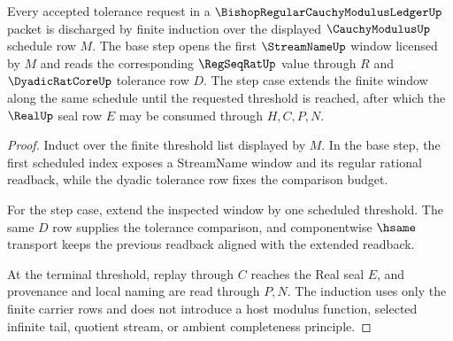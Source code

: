 \begin{theorem}
\label{thm:bishop-regular-cauchy-modulus-ledger-induction}
Every accepted tolerance request in a $\BishopRegularCauchyModulusLedgerUp$ packet is discharged by finite induction over the displayed $\CauchyModulusUp$ schedule row $M$. The base step opens the first $\StreamNameUp$ window licensed by $M$ and reads the corresponding $\RegSeqRatUp$ value through $R$ and $\DyadicRatCoreUp$ tolerance row $D$. The step case extends the finite window along the same schedule until the requested threshold is reached, after which the $\RealUp$ seal row $E$ may be consumed through $H,C,P,N$.
\end{theorem}
\begin{proof}
Induct over the finite threshold list displayed by $M$. In the base step, the first scheduled index exposes a StreamName window and its regular rational readback, while the dyadic tolerance row fixes the comparison budget.

For the step case, extend the inspected window by one scheduled threshold. The same $D$ row supplies the tolerance comparison, and componentwise $\hsame$ transport keeps the previous readback aligned with the extended readback.

At the terminal threshold, replay through $C$ reaches the Real seal $E$, and provenance and local naming are read through $P,N$. The induction uses only the finite carrier rows and does not introduce a host modulus function, selected infinite tail, quotient stream, or ambient completeness principle.
\end{proof}




